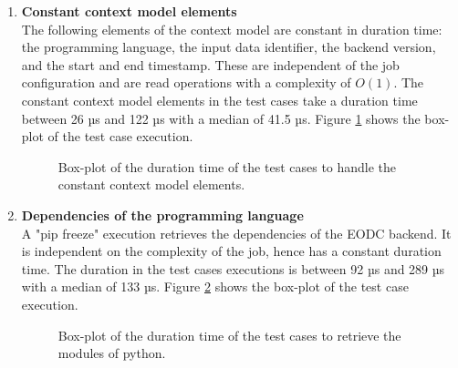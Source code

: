 \documentclass[draft,final]{vutinfth} %
\begin{document}
\begin{enumerate}
	\item \textbf{Constant context model elements} \\
	The following elements of the context model are constant in duration time: the programming language, the input data identifier, the backend version, and the start and end timestamp. These are independent of the job configuration and are read operations with a complexity of $O(1)$. The constant context model elements in the test cases take a duration time between 26 µs and 122 µs with a median of 41.5 µs. Figure \ref{fig:evaluation_perf_static_cm} shows the box-plot of the test case execution.
	\begin{figure}[!h]
		\centering
		\caption{Box-plot of the duration time of the test cases to handle the constant context model elements.}
		\label{fig:evaluation_perf_static_cm}		
	\end{figure}
	\item \textbf{Dependencies of the programming language} \\
	A "pip freeze" execution retrieves the dependencies of the EODC backend. It is independent on the complexity of the job, hence has a constant duration time. The duration in the test cases executions is between 92 µs and 289 µs with a median of 133 µs. Figure \ref{fig:evaluation_perf_python} shows the box-plot of the test case execution.
	\begin{figure}[!h]
		\centering
		\caption{Box-plot of the duration time of the test cases to retrieve the modules of python.}
		\label{fig:evaluation_perf_python}		
\end{figure}
\end{enumerate}
\end{document}
